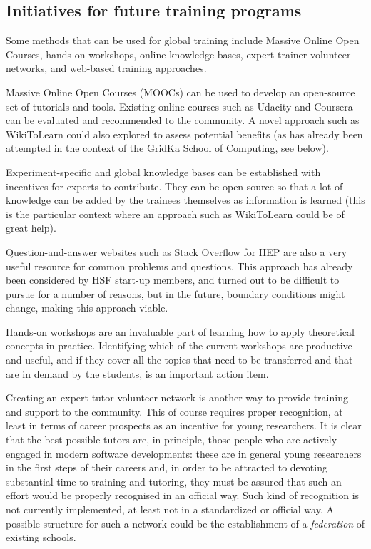 \subsection{Initiatives for future training programs\label{sec:initiatives}} 

Some methods that can be used for global training include Massive Online Open Courses, hands-on workshops, online knowledge bases, expert trainer volunteer networks, and web-based training approaches.

Massive Online Open Courses (MOOCs) can be used to develop an open-source set of tutorials and tools. Existing online courses such as Udacity and Coursera can be evaluated and recommended to the community. A novel approach such as WikiToLearn could also explored to assess potential benefits (as has already been attempted in the context of the GridKa School of Computing, see below).

Experiment-specific and global knowledge bases can be established with incentives for experts to contribute. They can be open-source so that a lot of knowledge can be added by the trainees themselves as information is learned (this is the particular context where an approach such as WikiToLearn could be of great help). 

Question-and-answer websites such as Stack Overflow for HEP are also a very useful resource for common problems and questions. This approach has already been considered by HSF start-up members, and turned out to be difficult to pursue for a number of reasons, but in the future, boundary conditions might change, making this approach viable.

Hands-on workshops are an invaluable part of learning how to apply theoretical concepts in practice. Identifying which of the current workshops are productive and useful, and if they cover all the topics that need to be transferred and that are in demand by the students, is an important action item. 

Creating an expert tutor volunteer network is another way to provide training and support to the community. 
This of course requires proper recognition, at least in terms of career prospects as an incentive for young researchers. It is clear that the best possible tutors are, in principle, those people who are actively engaged in modern software developments: these are in general young researchers in the first steps of their careers and, in order to be attracted to devoting substantial time to training and tutoring, they must be assured that such an effort would be properly recognised in an official way. Such kind of recognition is not currently implemented, at least not in a standardized or official way. A possible structure for such a network could be the establishment of a {\em federation} of existing schools.

